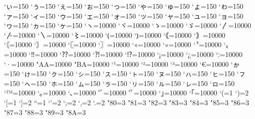 \prebreakpenalty`ぃ=150
\prebreakpenalty`ぅ=150
\prebreakpenalty`ぇ=150
\prebreakpenalty`ぉ=150
\prebreakpenalty`っ=150
\prebreakpenalty`ゃ=150
\prebreakpenalty`ゅ=150
\prebreakpenalty`ょ=150
\prebreakpenalty`ゎ=150%
\prebreakpenalty`ァ=150
\prebreakpenalty`ィ=150
\prebreakpenalty`ゥ=150
\prebreakpenalty`ェ=150
\prebreakpenalty`ォ=150
\prebreakpenalty`ッ=150
\prebreakpenalty`ャ=150
\prebreakpenalty`ュ=150
\prebreakpenalty`ョ=150
\prebreakpenalty`ヮ=150%
\prebreakpenalty`ヵ=150%
\prebreakpenalty`ヶ=150%
\prebreakpenalty`ヽ=10000
\prebreakpenalty`ヾ=10000
\prebreakpenalty`ゝ=10000
\prebreakpenalty`ゞ=10000
\prebreakpenalty`〳=10000
\prebreakpenalty`〴=10000
\prebreakpenalty`〵=10000
\prebreakpenalty`〻=10000
\postbreakpenalty`⦅=10000
\prebreakpenalty`⦆=10000
\postbreakpenalty`｟=10000
\prebreakpenalty`｠=10000
\postbreakpenalty`〘=10000
\prebreakpenalty`〙=10000
\postbreakpenalty`〖=10000
\prebreakpenalty`〗=10000
\postbreakpenalty`«=10000
\prebreakpenalty`»=10000
\postbreakpenalty`〝=10000
\prebreakpenalty`〟=10000
\prebreakpenalty`‼=10000
\prebreakpenalty`⁇=10000
\prebreakpenalty`⁈=10000
\prebreakpenalty`⁉=10000
\postbreakpenalty`¡=10000
\postbreakpenalty`¿=10000
\prebreakpenalty`ː=10000
\prebreakpenalty`·=10000
\prebreakpenalty"AA=10000%
\prebreakpenalty"BA=10000%
\prebreakpenalty`¹=10000
\prebreakpenalty`²=10000
\prebreakpenalty`³=10000
\postbreakpenalty`€=10000
\prebreakpenalty`ゕ=150
\prebreakpenalty`ゖ=150
\prebreakpenalty`ㇰ=150
\prebreakpenalty`ㇱ=150
\prebreakpenalty`ㇲ=150
\prebreakpenalty`ㇳ=150
\prebreakpenalty`ㇴ=150
\prebreakpenalty`ㇵ=150
\prebreakpenalty`ㇶ=150
\prebreakpenalty`ㇷ=150
\prebreakpenalty`ㇸ=150
\prebreakpenalty`ㇹ=150
\prebreakpenalty`ㇺ=150
\prebreakpenalty`ㇻ=150
\prebreakpenalty`ㇼ=150
\prebreakpenalty`ㇽ=150
\prebreakpenalty`ㇾ=150
\prebreakpenalty`ㇿ=150
\prebreakpenalty`™=10000
\prebreakpenalty`｡=10000
\prebreakpenalty`､=10000
\prebreakpenalty`ﾞ=10000
\prebreakpenalty`ﾟ=10000
\prebreakpenalty`｣=10000
\postbreakpenalty`｢=10000
\xspcode`(=1
\xspcode`)=2
\xspcode`[=1
\xspcode`]=2
\xspcode``=1
\xspcode`'=2
\xspcode`;=2
\xspcode`,=2
\xspcode`.=2
\xspcode"80=3
\xspcode"81=3
\xspcode"82=3
\xspcode"83=3
\xspcode"84=3
\xspcode"85=3
\xspcode"86=3
\xspcode"87=3
\xspcode"88=3
\xspcode"89=3
\xspcode"8A=3
